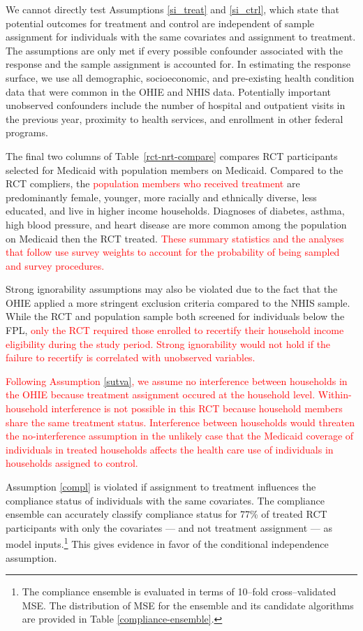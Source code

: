 \documentclass[hidelinks,12pt]{article}
\begin{document}
We cannot directly test Assumptions \eqref{si_treat} and \eqref{si_ctrl}, which state that potential outcomes for treatment and control are independent of sample assignment for individuals with the same covariates and assignment to treatment. The assumptions are only met if every possible confounder associated with the response and the sample assignment is accounted for. In estimating the response surface, we use all demographic, socioeconomic, and pre-existing health condition data that were common in the OHIE and NHIS data. Potentially important unobserved confounders include the number of hospital and outpatient visits in the previous year, proximity to health services, and enrollment in other federal programs. 

The final two columns of Table~\ref{rct-nrt-compare} compares RCT participants selected for Medicaid with population members on Medicaid. Compared to the RCT compliers, the \textcolor{red}{population members who received treatment} are predominantly female, younger, more racially and ethnically diverse, less educated, and live in higher income households. Diagnoses of diabetes, asthma, high blood pressure, and heart disease are more common among the population on Medicaid then the RCT treated. \textcolor{red}{These summary statistics and the analyses that follow use survey weights to account for the probability of being sampled and survey procedures.}

Strong ignorability assumptions may also be violated due to the fact that the OHIE applied a more stringent exclusion criteria compared to the NHIS sample. While the RCT and population sample both screened for individuals below the FPL,  \textcolor{red}{only the RCT required those enrolled to recertify their household income eligibility during the study period. Strong ignorability would not hold if the failure to recertify is correlated with unobserved variables.} 

\textcolor{red}{Following Assumption \ref{sutva}, we assume no interference between households in the OHIE because treatment assignment occured at the household level. Within-household interference is not possible in this RCT because household members share the same treatment status. Interference between households would threaten the no-interference assumption in the unlikely case that the Medicaid coverage of individuals in treated households affects the health care use of individuals in households assigned to control.} 

Assumption \eqref{compl} is violated if assignment to treatment influences the compliance status of individuals with the same covariates. The compliance ensemble can accurately classify compliance status for 77\% of treated RCT participants with only the covariates --- and not treatment assignment --- as model inputs.\footnote{The compliance ensemble is evaluated in terms of 10--fold cross--validated MSE. The distribution of MSE for the ensemble and its candidate algorithms are provided in Table \ref{compliance-ensemble}.}  This gives evidence in favor of the conditional independence assumption.
\end{document}
